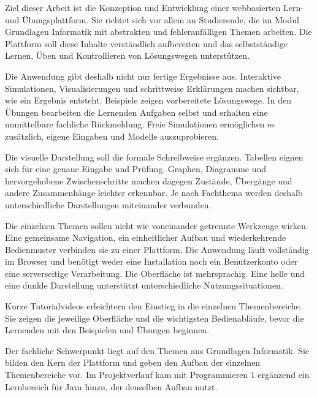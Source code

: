 
Ziel dieser Arbeit ist die Konzeption und Entwicklung einer webbasierten Lern- und
Übungsplattform. Sie richtet sich vor allem an Studierende, die im Modul
\glqq Grundlagen Informatik\grqq{} mit abstrakten und fehleranfälligen Themen arbeiten.
Die Plattform soll diese Inhalte verständlich aufbereiten und das selbstständige Lernen,
Üben und Kontrollieren von Lösungswegen unterstützen.

Die Anwendung gibt deshalb nicht nur fertige Ergebnisse aus. Interaktive Simulationen,
Visualisierungen und schrittweise Erklärungen machen sichtbar, wie ein Ergebnis entsteht.
Beispiele zeigen vorbereitete Lösungswege. In den Übungen bearbeiten die Lernenden
Aufgaben selbst und erhalten eine unmittelbare fachliche Rückmeldung. Freie Simulationen
ermöglichen es zusätzlich, eigene Eingaben und Modelle auszuprobieren.

Die visuelle Darstellung soll die formale Schreibweise ergänzen. Tabellen eignen sich für
eine genaue Eingabe und Prüfung. Graphen, Diagramme und hervorgehobene Zwischenschritte
machen dagegen Zustände, Übergänge und andere Zusammenhänge leichter erkennbar. Je nach
Fachthema werden deshalb unterschiedliche Darstellungen miteinander verbunden.

Die einzelnen Themen sollen nicht wie voneinander getrennte Werkzeuge wirken. Eine
gemeinsame Navigation, ein einheitlicher Aufbau und wiederkehrende Bedienmuster verbinden
sie zu einer Plattform. Die Anwendung läuft vollständig im Browser und benötigt weder
eine Installation noch ein Benutzerkonto oder eine serverseitige Verarbeitung. Die
Oberfläche ist mehrsprachig. Eine helle und eine dunkle Darstellung unterstützt
unterschiedliche Nutzungssituationen.

Kurze Tutorialvideos erleichtern den Einstieg in die einzelnen Themenbereiche. Sie zeigen
die jeweilige Oberfläche und die wichtigsten Bedienabläufe, bevor die Lernenden mit den
Beispielen und Übungen beginnen.

Der fachliche Schwerpunkt liegt auf den Themen aus Grundlagen Informatik. Sie bilden den
Kern der Plattform und geben den Aufbau der einzelnen Themenbereiche vor. Im
Projektverlauf kam mit Programmieren 1 ergänzend ein Lernbereich für Java hinzu, der
denselben Aufbau nutzt.
